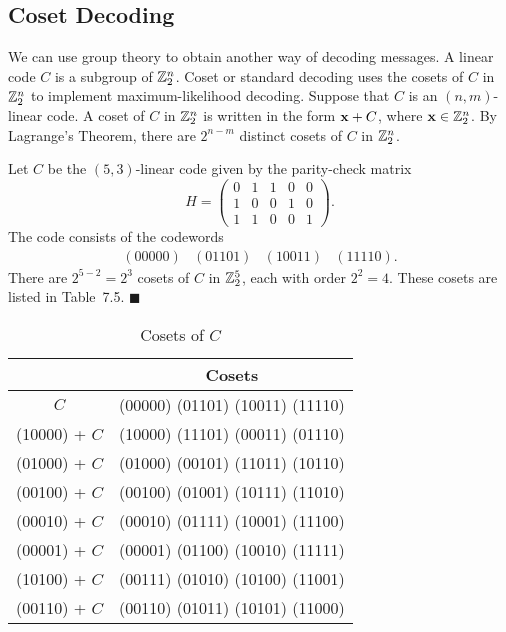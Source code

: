  
\subsection*{Coset Decoding}
 
 
We can use group theory to obtain another way of decoding messages.  A
linear code $C$ is a subgroup of ${\Bbb Z}_2^n$. {\bfi
Coset\/} or {\bfi standard
decoding\/} uses the cosets of $C$ in ${\Bbb
Z}_2^n$ to implement maximum-likelihood decoding. Suppose that $C$ is
an $(n,m)$-linear code. A coset of $C$ in ${\Bbb Z}_2^n$ is written in
the form ${\bold x} + C$, where ${\bold x} \in {\Bbb Z}_2^n$. By
Lagrange's Theorem, there are $2^{n-m}$ distinct cosets of $C$ in 
${\Bbb Z}_2^n$.
 
 
\vspace{2ex}
 
 
Let $C$ be the $(5,3)$-linear code given by the parity-check matrix
\[
H =
\left(
\begin{array}{cccccc}
0 & 1 & 1 & 0 & 0 \\
1 & 0 & 0 & 1 & 0 \\
1 & 1 & 0 & 0 & 1
\end{array}
\right).
\]
The code consists of the codewords
\[
\begin{array}{cccc}
(00000)& (01101)& (10011)& (11110).
\end{array}
\]
There are $2^{5-2} = 2^3$ cosets of $C$ in ${\Bbb Z}_2^5$, each with
order $2^2 =4$.  These cosets are listed in Table~7.5. 
\hspace{\fill} $\blacksquare$
 
 
\begin{table}
\caption{Cosets of $C$}{\small
\begin{center}
\begin{tabular}{|c|c|}
\hline
 & Cosets \\
\hline
          $C$ & (00000)  (01101)  (10011)  (11110) \\
(10000) + $C$ & (10000)  (11101)  (00011)  (01110) \\
(01000) + $C$ & (01000)  (00101)  (11011)  (10110) \\
(00100) + $C$ & (00100)  (01001)  (10111)  (11010) \\
(00010) + $C$ & (00010)  (01111)  (10001)  (11100) \\
(00001) + $C$ & (00001)  (01100)  (10010)  (11111) \\
(10100) + $C$ & (00111)  (01010)  (10100)  (11001) \\
(00110) + $C$ & (00110)  (01011)  (10101)  (11000) \\
\hline
\end{tabular}
\end{center}
}
\end{table}
 
